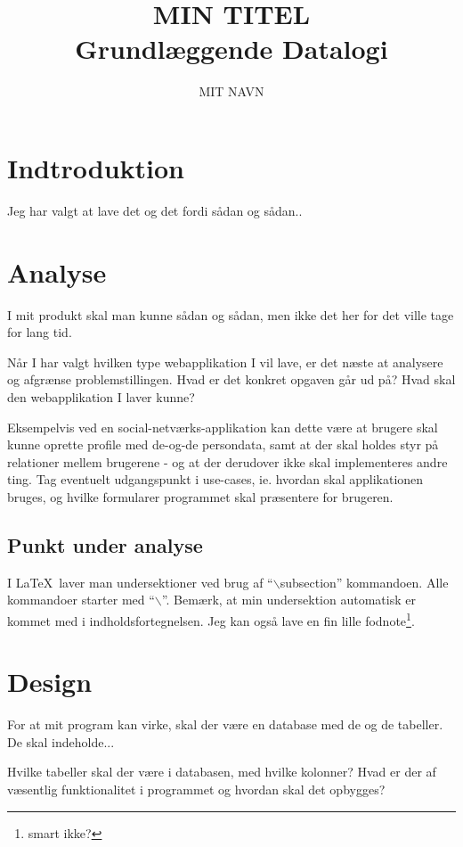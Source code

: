 \documentclass[10pt,a4paper,danish]{article}
\title{MIN TITEL \\ Grundlæggende Datalogi}
\author{MIT NAVN}
\begin{document}
\maketitle
\newpage

\tableofcontents
\newpage






\section{Indtroduktion}
Jeg har valgt at lave det og det fordi sådan og sådan..


\section{Analyse}
I mit produkt skal man kunne sådan og sådan, men ikke det her for det
ville tage for lang tid.

Når I har valgt hvilken type webapplikation I vil lave, er det næste
at analysere og afgrænse problemstillingen. Hvad er det konkret
opgaven går ud på? Hvad skal den webapplikation I laver
kunne?

Eksempelvis ved en social-netværks-applikation kan dette være
at brugere skal kunne oprette profile med de-og-de persondata, samt at
der skal holdes styr på relationer mellem brugerene - og at der
derudover ikke skal implementeres andre ting. Tag eventuelt
udgangspunkt i use-cases, ie. hvordan skal applikationen bruges, og
hvilke formularer programmet skal præsentere for brugeren.

\subsection{Punkt under analyse}
I \LaTeX\ laver man undersektioner ved brug af "`$\backslash$subsection"'
kommandoen. Alle kommandoer starter med "`$\backslash$"'. Bemærk, at min
undersektion automatisk er kommet med i indholdsfortegnelsen. Jeg kan
også lave en fin lille fodnote\footnote{smart ikke?}.

\section{Design}
For at mit program kan virke, skal der være en database med de og de
tabeller. De skal indeholde...

Hvilke tabeller skal der være i databasen, med hvilke kolonner? Hvad
er der af væsentlig funktionalitet i programmet og hvordan skal det
opbygges?
\end{document}
